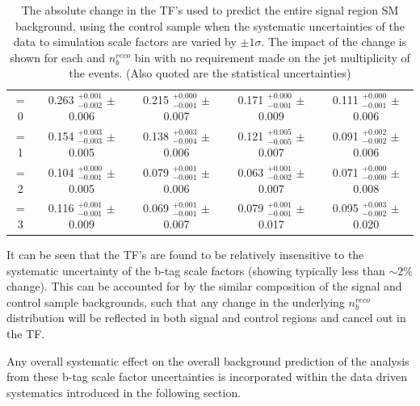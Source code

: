\begin{table}[ht!]
\begin{center}
\begin{tabular*}{0.95\textwidth}{@{\extracolsep{\fill}} ccccc}
= 0                    & 0.263 $^{+0.001}_{-0.002}$  $\pm$  0.006       & 0.215 $^{+0.000}_{-0.001}$  $\pm$  0.007       & 0.171 $_{-0.001}^{+0.000}$ $\pm$  0.009       & 0.111 $_{-0.001}^{+0.000}$  $\pm$  0.006      \\
= 1                    & 0.154 $^{+0.003}_{-0.003}$  $\pm$  0.005       & 0.138 $^{+0.003}_{-0.004}$  $\pm$  0.006       & 0.121 $^{+0.005}_{-0.005}$  $\pm$  0.007       & 0.091 $^{+0.002}_{-0.002}$  $\pm$  0.006      \\
= 2                    & 0.104 $^{+0.000}_{-0.001}$  $\pm$  0.005       & 0.079 $^{+0.001}_{-0.001}$  $\pm$  0.006       & 0.063 $^{+0.001}_{-0.002}$  $\pm$  0.007       & 0.071 $^{+0.000}_{-0.000}$  $\pm$  0.008      \\
= 3                    & 0.116 $^{+0.001}_{-0.001}$  $\pm$  0.009       & 0.069 $^{+0.001}_{-0.001}$  $\pm$  0.007       & 0.079 $^{+0.001}_{-0.001}$  $\pm$  0.017       & 0.095 $_{-0.002}^{+0.003}$  $\pm$  0.020      \\ 

\end{tabular*}
\end{center}
\caption[The absolute change in the \ac{TF}'s used to predict the entire signal region \ac{SM} background, using the \mupjets control sample when the systematic uncertainties of the data to simulation scale factors are varied by $\pm 1 \sigma$.]{The absolute change in the \ac{TF}'s used to predict the entire signal region \ac{SM} background, using the \mupjets control sample when the systematic uncertainties of the data to simulation scale factors are varied by $\pm 1 \sigma$. The impact of the change is shown for each \theht and $n_{b}^{reco}$ bin with no requirement made on the jet multiplicity of the events. (Also quoted are the statistical uncertainties)}\label{tab:btagsfuncertainties}
\end{table}
\def\arraystretch{1.0}

It can be seen that the \ac{TF}'s are found to be relatively insensitive to the systematic uncertainty of the b-tag scale factors (showing typically less than $\sim2\%$ change). This can be accounted for by the similar composition of the signal and control sample backgrounds, such that any change in the underlying $n_{b}^{reco}$ distribution will be reflected in both signal and control regions and cancel out in the \ac{TF}. 

Any overall systematic effect on the overall background prediction of the analysis from these b-tag scale factor uncertainties is incorporated within the data driven systematics introduced in the following section.

